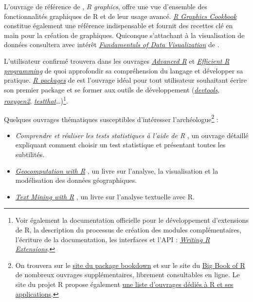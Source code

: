 \documentclass[
  french,
]{scrbook}
\providecommand{\tightlist}{%
  \setlength{\itemsep}{0pt}\setlength{\parskip}{0pt}}
\begin{document}
L'ouvrage de référence de \textcite{murrell2019}, \emph{R graphics}, offre une vue d'ensemble des fonctionnalités graphiques de R et de leur usage avancé. \href{https://r-graphics.org/}{\emph{R Graphics Cookbook}} \autocite{chang2012} constitue également une référence indispensable et fournit des recettes clé en main pour la création de graphiques. Quiconque s'attachant à la visualisation de données consultera avec intérêt \href{https://clauswilke.com/dataviz/}{\emph{Fundamentals of Data Visualization}} de \textcite{wilke2019}.

L'utilisateur confirmé trouvera dans les ouvrages \href{https://adv-r.hadley.nz/}{\emph{Advanced R}} \autocite{wickham2019} et \href{https://csgillespie.github.io/efficientR/}{\emph{Efficient R programming}} \autocite{gillespie2016} de quoi approfondir sa compréhension du langage et développer sa pratique. \href{https://r-pkgs.org/}{\emph{R packages}} de \textcite{wickham2015} est l'ouvrage idéal pour tout utilisateur souhaitant écrire son premier package et se former aux outils de développement (\href{https://devtools.r-lib.org/}{\emph{devtools}}, \href{https://roxygen2.r-lib.org/}{\emph{roxygen2}}, \href{https://testthat.r-lib.org/}{\emph{testthat}}\ldots)\footnote{Voir également la documentation officielle pour le développement d'extensions de R, la description du processus de création des modules complémentaires, l'écriture de la documentation, les interfaces et l'API : \href{https://cran.r-project.org/doc/manuals/r-release/R-exts.html}{\emph{Writing R Extensions}}.}.

Quelques ouvrages thématiques susceptibles d'intéresser l'archéologue\footnote{On trouvera sur le \href{https://bookdown.org/home/}{site du package bookdown} et sur le site du \href{https://www.bigbookofr.com/}{Big Book of R} de nombreux ouvrages supplémentaires, librement consultables en ligne. Le site du projet R propose également \href{https://www.r-project.org/doc/bib/R-books.html}{une liste d'ouvrages dédiés à R et ses applications}.} :

\begin{itemize}
\tightlist
\item
  \emph{Comprendre et réaliser les tests statistiques à l'aide de R} \autocite{millot2014}, un ouvrage détaillé expliquant comment choisir un test statistique et présentant toutes les subtilités.
\item
  \href{https://geocompr.robinlovelace.net/}{\emph{Geocomputation with R}} \autocite{lovelace2020}, un livre sur l'analyse, la visualisation et la modélisation des données géographiques.
\item
  \href{https://www.tidytextmining.com/}{\emph{Text Mining with R}} \autocite{silge2017}, un livre sur l'analyse textuelle avec R.
\end{itemize}
\end{document}
